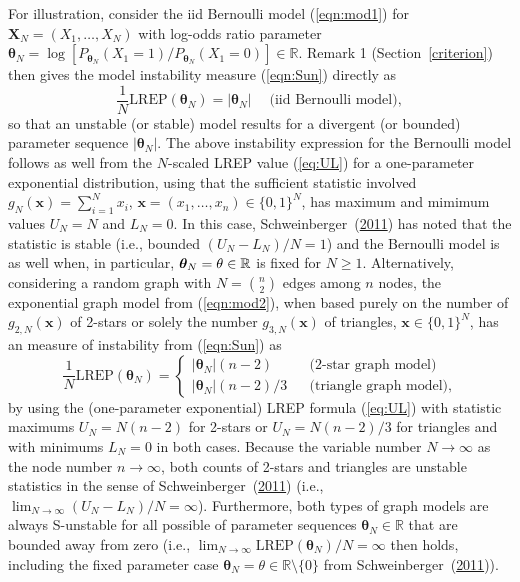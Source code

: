 \documentclass[12pt]{article}
\theoremstyle{definition}
\newcommand{\REP}{\mathrm{LREP}}
\begin{document}
    For illustration, consider the iid Bernoulli model (\ref{eqn:mod1}) for $\boldsymbol X_N=(X_1,\ldots,X_N)$ with log-odds ratio parameter $\boldsymbol \theta_N = \log[ P_{\boldsymbol \theta_N}(X_1=1)/ P_{\boldsymbol \theta_N}(X_1=0)]\in\mathbb{R}$.  Remark 1 (Section~\ref{criterion}) then gives the model instability measure (\ref{eqn:Sun}) directly as
      \[
     \frac{1}{N}\REP(\boldsymbol \theta_N ) = |\boldsymbol \theta_N|\quad\; \mbox{(iid Bernoulli model)},
   \]
    so that an unstable (or stable) model results for a divergent (or bounded) parameter sequence  $|\boldsymbol \theta_N|$.  The above   instability expression  for the Bernoulli model  follows as well from  the $N$-scaled LREP value (\ref{eq:UL}) for a one-parameter exponential distribution, using that the sufficient statistic involved $g_N(\boldsymbol x)= \sum_{i=1}^N x_i$, $\boldsymbol x =(x_1,\ldots,x_n)\in\{0,1\}^N$, has maximum and mimimum values $U_N=N$ and $L_N=0$.   In this case, Schweinberger~(\protect\hyperlink{ref-schweinberger2011instability}{2011}) has noted that the statistic is stable (i.e., bounded $(U_N-L_N)/N=1$) and the Bernoulli model is as well when, in particular, $\boldsymbol \theta_N=\bold \theta \in\mathbb{R}$ is fixed for $N \geq 1$.
       Alternatively, considering a random graph with $N={n \choose 2}$ edges among $n$ nodes, the exponential graph model from (\ref{eqn:mod2}), when based purely on the number of $g_{2,N}(\boldsymbol x)$ of 2-stars  or solely the number $g_{3,N}(\boldsymbol x)$  of triangles,  $\boldsymbol x\in\{0,1\}^N$, has an measure of instability from (\ref{eqn:Sun}) as
   \[
     \frac{1}{N}\REP(\boldsymbol \theta_N )  = \left\{ \begin{array}{lcl} |\boldsymbol \theta_N| (n-2) && \mbox{(2-star graph model)}\\
       |\boldsymbol \theta_N|(n-2)/3 &&\mbox{(triangle graph model)},\end{array}\right.
     \]
  by using the (one-parameter exponential) LREP formula (\ref{eq:UL}) with statistic maximums $U_N= N(n-2)$ for 2-stars or $U_N= N(n-2)/3$ for triangles  and with minimums $L_N=0$ in both cases.    Because the variable number $N\to \infty$ as the node number $n\to \infty$, both counts of 2-stars and triangles are unstable statistics in the sense of Schweinberger~(\protect\hyperlink{ref-schweinberger2011instability}{2011}) (i.e., $\lim_{N\to \infty} (U_N-L_N)/N=\infty$).  Furthermore, both types of graph models are always S-unstable for all possible of parameter sequences
   $ \boldsymbol \theta_N \in\mathbb{R}$ that are bounded away from zero (i.e.,  $\lim_{N\to \infty}\REP(\boldsymbol \theta_N )/N=\infty$ then  holds, including the fixed parameter case $\boldsymbol \theta_N=\theta\in\mathbb{R}\setminus \{0\}$  from Schweinberger~(\protect\hyperlink{ref-schweinberger2011instability}{2011})).
\end{document}
